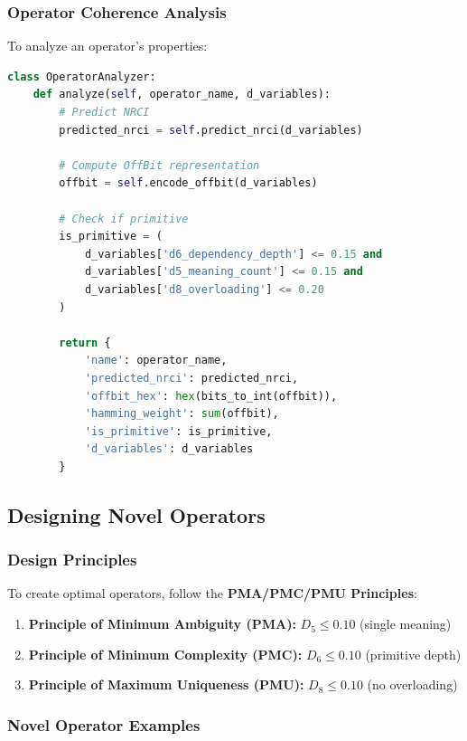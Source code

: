 \subsubsection{Operator Coherence Analysis}

To analyze an operator's properties:

\begin{lstlisting}[language=Python, caption=Operator Analysis]
class OperatorAnalyzer:
    def analyze(self, operator_name, d_variables):
        # Predict NRCI
        predicted_nrci = self.predict_nrci(d_variables)
        
        # Compute OffBit representation
        offbit = self.encode_offbit(d_variables)
        
        # Check if primitive
        is_primitive = (
            d_variables['d6_dependency_depth'] <= 0.15 and
            d_variables['d5_meaning_count'] <= 0.15 and
            d_variables['d8_overloading'] <= 0.20
        )
        
        return {
            'name': operator_name,
            'predicted_nrci': predicted_nrci,
            'offbit_hex': hex(bits_to_int(offbit)),
            'hamming_weight': sum(offbit),
            'is_primitive': is_primitive,
            'd_variables': d_variables
        }
\end{lstlisting}

\subsection{Designing Novel Operators}

\subsubsection{Design Principles}

To create optimal operators, follow the \textbf{PMA/PMC/PMU Principles}:

\begin{enumerate}
    \item \textbf{Principle of Minimum Ambiguity (PMA):} $D_5 \leq 0.10$ (single meaning)
    \item \textbf{Principle of Minimum Complexity (PMC):} $D_6 \leq 0.10$ (primitive depth)
    \item \textbf{Principle of Maximum Uniqueness (PMU):} $D_8 \leq 0.10$ (no overloading)
\end{enumerate}

\subsubsection{Novel Operator Examples}

